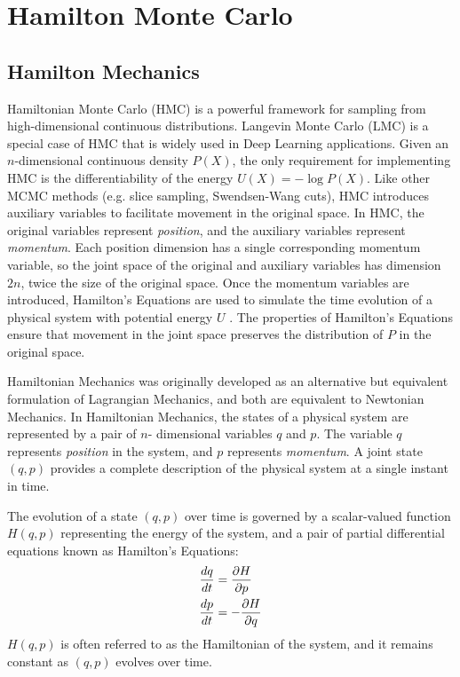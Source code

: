 \documentclass{article}
\begin{document}
\section{Hamilton Monte Carlo}
\subsection{Hamilton Mechanics}
Hamiltonian Monte Carlo (HMC) is a powerful framework for sampling from high-dimensional continuous distributions. Langevin Monte Carlo (LMC) is a special case of HMC that is widely used in Deep Learning applications. Given an $n$-dimensional continuous density $P(X)$, the only requirement for implementing HMC is the differentiability of the energy $U(X) = -\log P(X)$. Like other MCMC methods (e.g. slice sampling, Swendsen-Wang cuts), HMC introduces auxiliary variables to facilitate movement in the original space. In HMC, the original variables represent \textit{position}, and the auxiliary variables represent \textit{momentum}. Each position dimension has a single corresponding momentum variable, so the joint space of the original and auxiliary variables has dimension $2n$, twice the size of the original space. Once the momentum variables are introduced, Hamilton’s Equations are used to simulate the time evolution of a physical system with potential energy $U$ . The properties of Hamilton’s Equations ensure that movement in the joint space preserves the distribution of $P$ in the original space.

Hamiltonian Mechanics was originally developed as an alternative but equivalent formulation of Lagrangian Mechanics, and both are equivalent to Newtonian Mechanics. In Hamiltonian Mechanics, the states of a physical system are represented by a pair of $n$- dimensional variables $q$ and $p$. The variable $q$ represents \textit{position} in the system, and $p$ represents \textit{momentum}. A joint state $(q, p)$ provides a complete description of the physical system at a single instant in time.

The evolution of a state $(q, p)$ over time is governed by a scalar-valued function $H(q, p)$ representing the energy of the system, and a pair of partial differential equations known as Hamilton’s Equations:
\begin{align*}
    \frac{dq}{dt}&=\frac{\partial H}{\partial p}\\
    \frac{dp}{dt}&=-\frac{\partial H}{\partial q}
\end{align*}
$H(q, p)$ is often referred to as the Hamiltonian of the system, and it remains constant as $(q,p)$ evolves over time.
\end{document}
